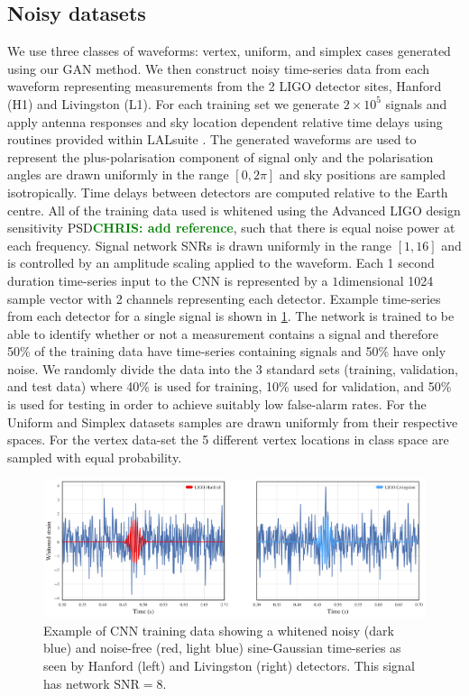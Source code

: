 \documentclass[12pt]{iopart}
\newcommand{\chris}[1]{\textbf{\textcolor{green}{CHRIS: #1}}}
\newcommand{\ndimensional}[1]{$#1$\nobreakdash\discretionary{-}{-}{-}dimensional}
\begin{document}
\subsection{Noisy datasets} 
We use three classes of waveforms: vertex, uniform, and simplex cases generated using our \ac{GAN} method. We then construct noisy time-series data from each waveform representing measurements from the 2 LIGO detector sites, Hanford (H1) and Livingston (L1). For each training set we generate $2\times 10^5$ signals and apply antenna responses and sky location dependent relative time delays using routines provided within LALsuite \cite{lalsuite}. The generated waveforms are used to represent the plus-polarisation component of signal only and the polarisation angles are drawn uniformly in the range $[0,2\pi]$ and sky positions are sampled isotropically. Time delays between detectors are computed relative to the Earth centre. All of the training data used is whitened using the Advanced LIGO design sensitivity \ac{PSD}\chris{add reference}, such that there is equal noise power at each frequency. Signal network \acp{SNR} is drawn uniformly in the range $[1,16]$ and is controlled by an amplitude scaling applied to the waveform. Each 1 second duration time-series input to the \ac{CNN} is represented by a \ndimensional{1} 1024 sample vector with 2 channels representing each detector. Example time-series from each detector for a single signal is shown in \cref{fig:cnn_training}. The network is trained to be able to identify whether or not a measurement contains a signal and therefore 50\% of the training data have time-series containing signals and 50\% have only noise. We randomly divide the data into the 3 standard sets (training, validation, and test data) where 40\% is used for training, 10\% used for validation, and 50\% is used for testing in order to achieve suitably low false-alarm rates. For the Uniform and Simplex datasets samples are drawn uniformly from their respective spaces. For the vertex data-set the 5 different vertex locations in class space are sampled with equal probability.  

\begin{figure}[ht!]
    \centering
    \includegraphics[width=\textwidth]{figures/SNR8.png}
    \caption{Example of \ac{CNN} training data showing a whitened noisy (dark blue) and noise-free (red, light blue) sine-Gaussian time-series as seen by Hanford (left) and Livingston (right) detectors. This signal has network $\text{SNR}=8$.}
     \label{fig:cnn_training}
\end{figure}
\end{document}
